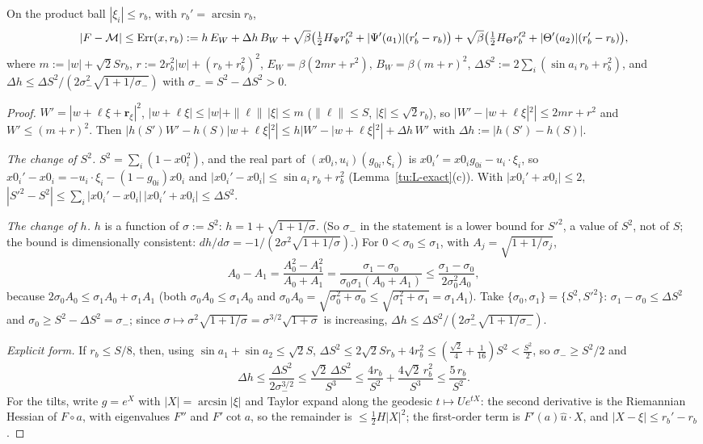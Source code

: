 \begin{lemma}\label{tu:L-taylor}
On the product ball $|\xi_i|\le r_b$, with $r_b'=\arcsin r_b$,
\[
|F-\mathcal M|\le{\rm Err}(x,r_b):=h\,E_W+\Delta h\,B_W+\sqrt\beta\big(\tfrac12H_\Psi r_b'^2+|\Psi'(a_1)|(r_b'-r_b)\big)
+\sqrt\beta\big(\tfrac12H_\Theta r_b'^2+|\Theta'(a_2)|(r_b'-r_b)\big),
\]
where $m:=|w|+\sqrt2Sr_b$, $r:=2r_b^2|w|+(r_b+r_b^2)^2$, $E_W=\beta(2mr+r^2)$, $B_W=\beta(m+r)^2$,
$\Delta S^2:=2\sum_i(\sin a_i\,r_b+r_b^2)$, and $\Delta h\le\Delta S^2/(2\sigma_-^2\sqrt{1+1/\sigma_-})$ with
$\sigma_-=S^2-\Delta S^2>0$.
\end{lemma}

\begin{proof}
$W'=|w+\ell\xi+\mathbf r_\xi|^2$, $|w+\ell\xi|\le|w|+\|\ell\|\,|\xi|\le m$ ($\|\ell\|\le S$, $|\xi|\le\sqrt2r_b$),
so $|W'-|w+\ell\xi|^2|\le2mr+r^2$ and $W'\le(m+r)^2$. Then
$|h(S')W'-h(S)|w+\ell\xi|^2|\le h|W'-|w+\ell\xi|^2|+\Delta h\,W'$ with $\Delta h:=|h(S')-h(S)|$.

\emph{The change of $S^2$.} $S^2=\sum_i(1-x0_i^2)$, and the real part of $(x0_i,u_i)(g_{0i},\xi_i)$ is
$x0_i'=x0_ig_{0i}-u_i\cdot\xi_i$, so $x0_i'-x0_i=-u_i\cdot\xi_i-(1-g_{0i})x0_i$ and $|x0_i'-x0_i|\le\sin a_i\,r_b+r_b^2$
(Lemma~\ref{tu:L-exact}(c)). With $|x0_i'+x0_i|\le2$, $|S'^2-S^2|\le\sum_i|x0_i'-x0_i|\,|x0_i'+x0_i|\le\Delta S^2$.

\emph{The change of $h$.} $h$ is a function of $\sigma:=S^2$: $h=1+\sqrt{1+1/\sigma}$. (So $\sigma_-$ in the statement is a
lower bound for $S'^2$, a value of $S^2$, not of $S$; the bound is dimensionally consistent: $dh/d\sigma=-1/(2\sigma^2\sqrt{1+1/\sigma})$.)
For $0<\sigma_0\le\sigma_1$, with $A_j=\sqrt{1+1/\sigma_j}$,
\[
A_0-A_1=\frac{A_0^2-A_1^2}{A_0+A_1}=\frac{\sigma_1-\sigma_0}{\sigma_0\sigma_1(A_0+A_1)}\le\frac{\sigma_1-\sigma_0}{2\sigma_0^2A_0},
\]
because $2\sigma_0A_0\le\sigma_1A_0+\sigma_1A_1$ (both $\sigma_0A_0\le\sigma_1A_0$ and $\sigma_0A_0=\sqrt{\sigma_0^2+\sigma_0}\le\sqrt{\sigma_1^2+\sigma_1}=\sigma_1A_1$).
Take $\{\sigma_0,\sigma_1\}=\{S^2,S'^2\}$: $\sigma_1-\sigma_0\le\Delta S^2$ and $\sigma_0\ge S^2-\Delta S^2=\sigma_-$; since
$\sigma\mapsto\sigma^2\sqrt{1+1/\sigma}=\sigma^{3/2}\sqrt{1+\sigma}$ is increasing, $\Delta h\le\Delta S^2/(2\sigma_-^2\sqrt{1+1/\sigma_-})$.

\emph{Explicit form.} If $r_b\le S/8$, then, using $\sin a_1+\sin a_2\le\sqrt2S$,
$\Delta S^2\le2\sqrt2Sr_b+4r_b^2\le(\frac{\sqrt2}4+\frac1{16})S^2<\frac{S^2}2$, so $\sigma_-\ge S^2/2$ and
\begin{equation}\label{tu:L-dh-explicit}
\Delta h\le\frac{\Delta S^2}{2\sigma_-^{3/2}}\le\frac{\sqrt2\,\Delta S^2}{S^3}\le\frac{4r_b}{S^2}+\frac{4\sqrt2\,r_b^2}{S^3}\le\frac{5\,r_b}{S^2}.
\end{equation} For the tilts, write $g=e^X$ with $|X|=\arcsin|\xi|$ and Taylor expand along the
geodesic $t\mapsto Ue^{tX}$: the second derivative is the Riemannian Hessian of $F\circ a$, with eigenvalues
$F''$ and $F'\cot a$, so the remainder is $\le\frac12H|X|^2$; the first-order term is $F'(a)\hat u\cdot X$, and
$|X-\xi|\le r_b'-r_b$.
\end{proof}

